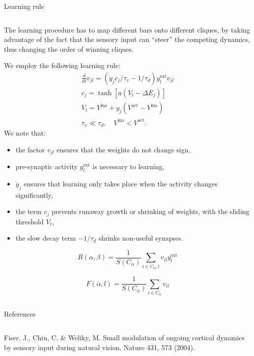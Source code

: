 \documentclass[final,hyperref={pdfpagelabels=false}]{beamer}
\begin{document}
\begin{frame}
\begin{columns}
\begin{column}{.64\textwidth}
\begin{minipage}[T]{.95\textwidth}
{\begin{block}{Learning rule}
\begin{columns}
							\begin{column}[T]{.5\textwidth}
								The learning procedure has to map different bars onto different cliques, by taking advantage of the fact that the sensory input can ``steer'' the competing dynamics, thus changing the order of winning cliques.
								
								We employ the following learning rule:
								\begin{gather*}
									\frac{d}{dt} v_{jl} = \left(\dot{y}_j c_j / \tau_v  - 1 / \tau_d\right) y_l^{\text{ext}} v_{jl}  \\
									c_j = \tanh{\left[a \left(V_t - \Delta E_j \right)\right]} \\
									 V_t = V^{\text{ina}} + y_j \left(V^{\text{act}} - V^{\text{ina}}\right)\\
									\tau_v \ll \tau_d, \quad V^{\text{ina}} < V^{\text{act}}.	
								\end{gather*}
								We note that:
								\begin{itemize}
									\item the factor $v_{jl}$ ensures that the weights do not change sign,
									\item pre-synaptic activity $y_l^{\text{ext}}$ is necessary to learning,
									\item $\dot{y}_j$ ensures that learning only takes place when the activity changes significantly,
									\item the term $c_j$ prevents runaway growth or shrinking of weights, with the sliding threshold $V_t$,
									\item the slow decay term $-1/\tau_d$ shrinks non-useful synapses.
								\end{itemize}
								
								\begin{equation}
									R(\alpha, \beta) = \frac{1}{S(C_\alpha)} \sum_{i\in C_\alpha, l} v_{il} y_l^{\text{ext}}
								\end{equation}
								
								\begin{equation}
									F(\alpha, l) = \frac{1}{S(C_\alpha)} \sum_{i\in C_\alpha} v_{il}
								\end{equation}
							\end{column}
						\end{columns}
							
						
					\end{block}
						

					\vfill
					\begin{refblock}{References}
						\begin{columns}
						 \begin{thebibliography}{1}
								\begin{column}[T]{.46\textwidth}
									\bibitem{fiser2004modulation}
									Fiser, J., Chiu, C. \& Weliky, M. Small modulation of ongoing cortical dynamics by sensory input during natural vision. Nature 431, 573 (2004).
										

\end{column}
\end{thebibliography}
\end{columns}
\end{refblock}}
\end{minipage}
\end{column}
\end{columns}
\end{frame}
\end{document}
